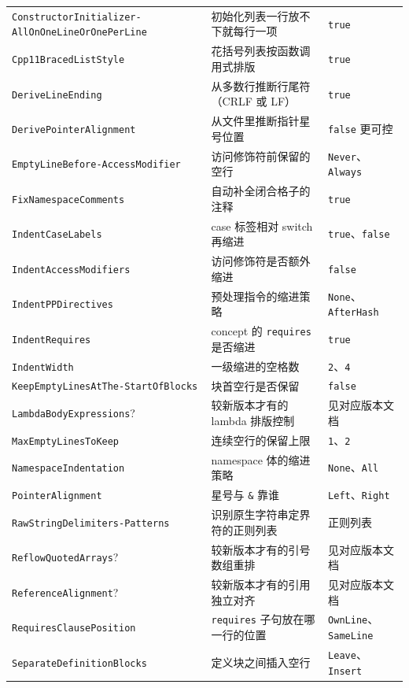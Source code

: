 \documentclass[12pt,a4paper,fontset=fandol]{ctexbook}
\begin{document}
{\begin{longtable}{@{}>{\raggedright\arraybackslash}p{}
                  >{\raggedright\arraybackslash}p{}
                  >{\raggedright\arraybackslash}p{}@{}}
\texttt{ConstructorInitializer-\allowbreak AllOnOneLineOrOnePerLine} & 初始化列表一行放不下就每行一项 & \texttt{true} \\
\texttt{Cpp11BracedListStyle} & 花括号列表按函数调用式排版 & \texttt{true} \\
\texttt{DeriveLineEnding} & 从多数行推断行尾符（CRLF 或 LF） & \texttt{true} \\
\texttt{DerivePointerAlignment} & 从文件里推断指针星号位置 & \texttt{false} 更可控 \\
\texttt{EmptyLineBefore-\allowbreak AccessModifier} & 访问修饰符前保留的空行 & \texttt{Never}、\texttt{Always} \\
\texttt{FixNamespaceComments} & 自动补全闭合格子的注释 & \texttt{true} \\
\texttt{IndentCaseLabels} & case 标签相对 switch 再缩进 & \texttt{true}、\texttt{false} \\
\texttt{IndentAccessModifiers} & 访问修饰符是否额外缩进 & \texttt{false} \\
\texttt{IndentPPDirectives} & 预处理指令的缩进策略 & \texttt{None}、\texttt{AfterHash} \\
\texttt{IndentRequires} & concept 的 \texttt{requires} 是否缩进 & \texttt{true} \\
\texttt{IndentWidth} & 一级缩进的空格数 & \texttt{2}、\texttt{4} \\
\texttt{KeepEmptyLinesAtThe-\allowbreak StartOfBlocks} & 块首空行是否保留 & \texttt{false} \\
\texttt{LambdaBodyExpressions}? & 较新版本才有的 lambda 排版控制 & 见对应版本文档 \\
\texttt{MaxEmptyLinesToKeep} & 连续空行的保留上限 & \texttt{1}、\texttt{2} \\
\texttt{NamespaceIndentation} & namespace 体的缩进策略 & \texttt{None}、\texttt{All} \\
\texttt{PointerAlignment} & 星号与 \texttt{\&} 靠谁 & \texttt{Left}、\texttt{Right} \\
\texttt{RawStringDelimiters-\allowbreak Patterns} & 识别原生字符串定界符的正则列表 & 正则列表 \\
\texttt{ReflowQuotedArrays}? & 较新版本才有的引号数组重排 & 见对应版本文档 \\
\texttt{ReferenceAlignment}? & 较新版本才有的引用独立对齐 & 见对应版本文档 \\
\texttt{RequiresClausePosition} & \texttt{requires} 子句放在哪一行的位置 & \texttt{OwnLine}、\texttt{SameLine} \\
\texttt{SeparateDefinitionBlocks} & 定义块之间插入空行 & \texttt{Leave}、\texttt{Insert} \\

\end{longtable}}
\end{document}
